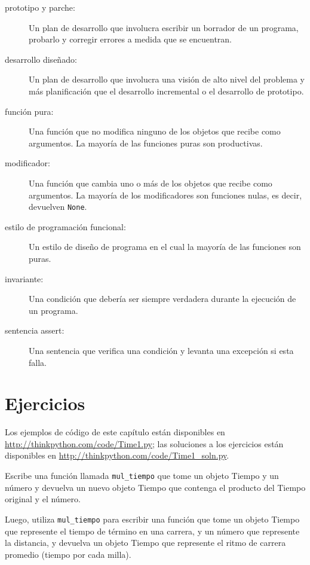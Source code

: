 \documentclass[10pt]{book}
\begin{document}
\begin{description}

\item[prototipo y parche:] Un plan de desarrollo que involucra
escribir un borrador de un programa, probarlo y corregir errores a medida que
se encuentran.

\item[desarrollo diseñado:] Un plan de desarrollo que involucra una
visión de alto nivel del problema y más planificación que el desarrollo
incremental o el desarrollo de prototipo.

\item[función pura:] Una función que no modifica ninguno de los objetos que
recibe como argumentos.  La mayoría de las funciones puras son productivas.

\item[modificador:] Una función que cambia uno o más de los objetos que
  recibe como argumentos.  La mayoría de los modificadores son funciones nulas, es decir,
  devuelven {\tt None}.

\item[estilo de programación funcional:] Un estilo de diseño de programa en el cual la
mayoría de las funciones son puras.

\item[invariante:] Una condición que debería ser siempre verdadera durante la
ejecución de un programa.

\item[sentencia assert:] Una sentencia que verifica una condición y levanta
una excepción si esta falla.

\end{description}


\section{Ejercicios}

Los ejemplos de código de este capítulo están disponibles en
\url{http://thinkpython.com/code/Time1.py}; las soluciones a los
ejercicios están disponibles en \url{http://thinkpython.com/code/Time1_soln.py}.

\begin{exercise}

Escribe una función llamada \verb"mul_tiempo" que tome un objeto Tiempo
y un número y devuelva un nuevo objeto Tiempo que contenga
el producto del Tiempo original y el número.

Luego, utiliza \verb"mul_tiempo" para escribir una función que tome un objeto
Tiempo que represente el tiempo de término en una carrera, y un número
que represente la distancia, y devuelva un objeto Tiempo que represente
el ritmo de carrera promedio (tiempo por cada milla).

\end{exercise}
\end{document}
